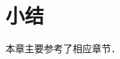 



















\section*{小结}
本章主要参考了\parencite{chen-li-2023-2ed-v1,oneill1983}相应章节．





\endinput
